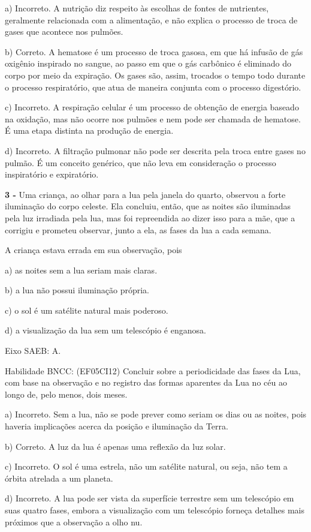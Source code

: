 a) Incorreto. A nutrição diz respeito às escolhas de fontes de
nutrientes, geralmente relacionada com a alimentação, e não explica o
processo de troca de gases que acontece nos pulmões.

b) Correto. A hematose é um processo de troca gasosa, em que há infusão
de gás oxigênio inspirado no sangue, ao passo em que o gás carbônico é
eliminado do corpo por meio da expiração. Os gases são, assim, trocados
o tempo todo durante o processo respiratório, que atua de maneira
conjunta com o processo digestório.

c) Incorreto. A respiração celular é um processo de obtenção de energia
baseado na oxidação, mas não ocorre nos pulmões e nem pode ser chamada
de hematose. É uma etapa distinta na produção de energia.

d) Incorreto. A filtração pulmonar não pode ser descrita pela troca
entre gases no pulmão. É um conceito genérico, que não leva em
consideração o processo inspiratório e expiratório.

\textbf{3 -} Uma criança, ao olhar para a lua pela janela do quarto,
observou a forte iluminação do corpo celeste. Ela concluiu, então, que
as noites são iluminadas pela luz irradiada pela lua, mas foi
repreendida ao dizer isso para a mãe, que a corrigiu e prometeu
observar, junto a ela, as fases da lua a cada semana.

A criança estava errada em sua observação, pois

a) as noites sem a lua seriam mais claras.

b) a lua não possui iluminação própria.

c) o sol é um satélite natural mais poderoso.

d) a visualização da lua sem um telescópio é enganosa.

Eixo SAEB: A.

Habilidade BNCC: (EF05CI12) Concluir sobre a periodicidade das fases da
Lua, com base na observação e no registro das formas aparentes da Lua no
céu ao longo de, pelo menos, dois meses.

a) Incorreto. Sem a lua, não se pode prever como seriam os dias ou as
noites, pois haveria implicações acerca da posição e iluminação da
Terra.

b) Correto. A luz da lua é apenas uma reflexão da luz solar.

c) Incorreto. O sol é uma estrela, não um satélite natural, ou seja, não
tem a órbita atrelada a um planeta.

d) Incorreto. A lua pode ser vista da superfície terrestre sem um
telescópio em suas quatro fases, embora a visualização com um telescópio
forneça detalhes mais próximos que a observação a olho nu.

